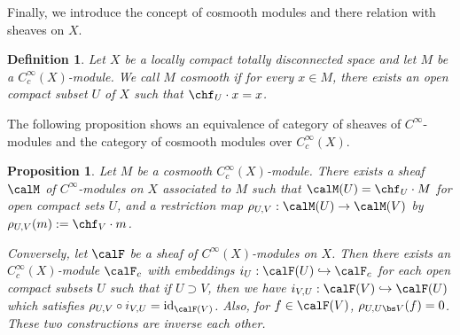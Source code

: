 \documentclass{article}
\newtheorem{definition}{Definition}[section]
\newtheorem{proposition}{Proposition}[section]
\begin{document}
Finally, we introduce the concept of cosmooth modules and there relation with sheaves on $X$. 
\begin{definition}
Let $X$ be a locally compact totally disconnected space and let $M$ be a $C_{c}^{\infty}(X)$-module. 
We call $M$ cosmooth if for every $x\in M$, there exists an open compact subset $U$ of $X$ such that $\chf_{U} \cdot x = x$. 
\end{definition}
The following proposition shows an equivalence of category of sheaves of $C^{\infty}$-modules and the category of cosmooth modules over $C_{c}^{\infty}(X)$. 
\begin{proposition}
Let $M$ be a cosmooth $C_{c}^{\infty}(X)$-module. There exists a sheaf $\calM$ of $C^{\infty}$-modules on $X$ associated to $M$ such that $\calM(U) = \chf_{U}\cdot M$ for open compact sets $U$, and a restriction map $\rho_{U, V} : \calM(U) \to \calM(V)$ by $\rho_{U, V}(m) := \chf_{V}\cdot m$. 

Conversely, let $\calF$ be a sheaf of $C^{\infty}(X)$-modules on $X$. Then there exists an $C_{c}^{\infty}(X)$-module $\calF_{c}$ with embeddings $i_U : \calF(U) \hookrightarrow \calF_{c}$ for each open compact subsets $U$ such that if $U\supset V$, then we have $i_{V, U} : \calF(V)\hookrightarrow \calF(U)$ which satisfies $\rho_{U, V} \circ i_{V, U} = \mathrm{id}_{\calF(V)}$. 
Also, for $f\in \calF(V)$, $\rho_{U, U\bs V}(f) = 0$. These two constructions are inverse each other. 
\end{proposition}
\end{document}
